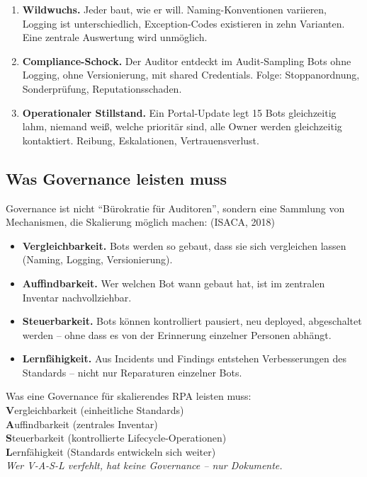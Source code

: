 \documentclass[11pt,a4paper,oneside]{article}
\newcommand{\caveatfontfallback}{\itshape}
\newcommand\caveatfont{\caveatfontfallback}%
\newcommand{\akzent}[1]{{\caveatfont\color{lpAmber}#1}}
\newcommand{\fachbegriff}[1]{\textbf{#1}}
\newcommand{\quelle}[1]{{\footnotesize\color{lpGray}(#1)}}
\begin{document}
\begin{enumerate}
  \item \fachbegriff{Wildwuchs.} Jeder baut, wie er will. Naming-Konventionen variieren, Logging ist unterschiedlich, Exception-Codes existieren in zehn Varianten. Eine zentrale Auswertung wird unmöglich.
  \item \fachbegriff{Compliance-Schock.} Der Auditor entdeckt im Audit-Sampling Bots ohne Logging, ohne Versionierung, mit shared Credentials. Folge: Stoppanordnung, Sonderprüfung, Reputationsschaden.
  \item \fachbegriff{Operationaler Stillstand.} Ein Portal-Update legt 15 Bots gleichzeitig lahm, niemand weiß, welche prioritär sind, alle Owner werden gleichzeitig kontaktiert. Reibung, Eskalationen, Vertrauensverlust.
\end{enumerate}

\subsection{Was Governance leisten muss}

Governance ist nicht ``Bürokratie für Auditoren'', sondern eine Sammlung von Mechanismen, die Skalierung möglich machen: \quelle{ISACA, 2018}

\begin{itemize}
  \item \textbf{Vergleichbarkeit.} Bots werden so gebaut, dass sie sich vergleichen lassen (Naming, Logging, Versionierung).
  \item \textbf{Auffindbarkeit.} Wer welchen Bot wann gebaut hat, ist im zentralen Inventar nachvollziehbar.
  \item \textbf{Steuerbarkeit.} Bots können kontrolliert pausiert, neu deployed, abgeschaltet werden -- ohne dass es von der Erinnerung einzelner Personen abhängt.
  \item \textbf{Lernfähigkeit.} Aus Incidents und Findings entstehen Verbesserungen des Standards -- nicht nur Reparaturen einzelner Bots.
\end{itemize}

\begin{eselsbox}[Eselsbrücke: \akzent{V-A-S-L}]
Was eine Governance für skalierendes RPA leisten muss:\\[2pt]
\textbf{V}ergleichbarkeit (einheitliche Standards)\\
\textbf{A}uffindbarkeit (zentrales Inventar)\\
\textbf{S}teuerbarkeit (kontrollierte Lifecycle-Operationen)\\
\textbf{L}ernfähigkeit (Standards entwickeln sich weiter)\\[2pt]
\emph{Wer V-A-S-L verfehlt, hat keine Governance -- nur Dokumente.}
\end{eselsbox}
\end{document}
